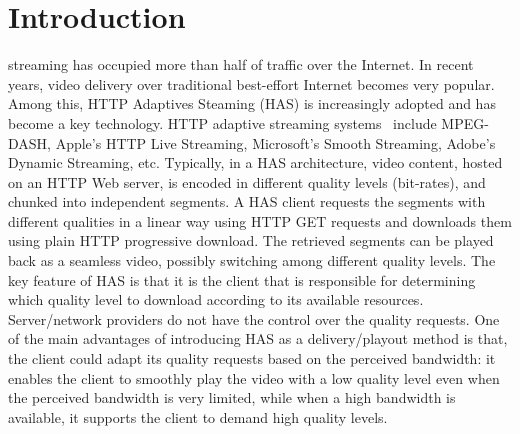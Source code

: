 \documentclass[journal]{IEEEtran}
\begin{document}
%
\IEEEpeerreviewmaketitle



\section{Introduction}
\label{sec:intro}
% 
% 
% 
% 
 streaming has occupied more than half of traffic over the Internet. In recent years, video delivery over traditional best-effort Internet becomes very popular. Among this, HTTP Adaptives Steaming (HAS) is increasingly adopted and has become a key technology. HTTP adaptive streaming systems~\cite{stockhammer2011dynamic} include MPEG-DASH, Apple's HTTP Live Streaming, Microsoft’s Smooth Streaming, Adobe’s Dynamic Streaming, etc. Typically, in a HAS architecture, video content, hosted on an HTTP Web server, is encoded in different quality levels (bit-rates), and chunked into independent segments. A HAS client requests the segments with different qualities in a linear way using HTTP GET requests and downloads them using plain HTTP progressive download. The retrieved segments can be played back as a seamless video, possibly switching among different quality levels. The key feature of HAS is that it is the client that is responsible for determining which quality level to download according to its available resources. Server/network providers do not have the control over the quality requests.  
One of the main advantages of introducing HAS as a delivery/playout method is that, the client could adapt its quality requests based on the perceived bandwidth: it enables the client to smoothly play the video with a low quality level even when the perceived bandwidth is very limited, while when a high bandwidth is available, it supports the client to demand high quality levels.  
\end{document}
